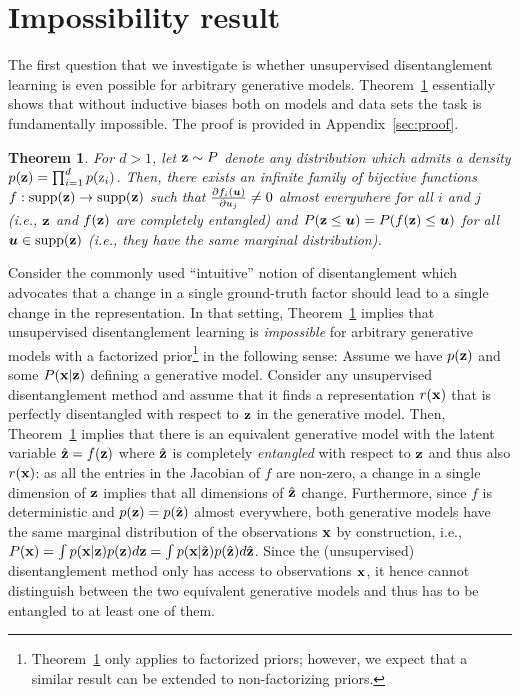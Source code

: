 \documentclass{article}
\newtheorem{theorem}{Theorem}
\renewcommand{\P}{P}
\newcommand{\supp}{\operatorname{supp}}
\begin{document}
\section{Impossibility result}\label{sec:impossibility}
The first question that we investigate is whether unsupervised disentanglement learning is even possible for arbitrary generative models.
Theorem~\ref{thm:impossibility} essentially shows that without inductive biases both on models and data sets the task is fundamentally impossible.
The proof is provided in Appendix~\ref{sec:proof}. 
\begin{theorem}
\label{thm:impossibility}
For $d>1$, let $\rvz\sim\P$ denote any distribution which admits a density $p({\mathbf{z}})=\prod_{i=1}^dp({\textnormal{z}}_i)$.
Then, there exists an infinite family of bijective functions $f:\supp(\rvz)\to\supp(\rvz)$ such that $\frac{\partial f_i({\bm{u}})}{\partial u_j} \neq 0$ almost everywhere for all $i$ and $j$ (i.e., ${\mathbf{z}}$ and $f({\mathbf{z}})$ are completely entangled) and $\P(\rvz \leq \vu) = \P(f(\rvz) \leq \vu)$ for all $\vu\in\supp(\rvz)$ (i.e., they have the same marginal distribution). 
\end{theorem}

Consider the commonly used ``intuitive'' notion of disentanglement which advocates that a change in a single ground-truth factor should lead to a single change in the representation.
In that setting, Theorem~\ref{thm:impossibility} implies that unsupervised disentanglement learning is \emph{impossible} for arbitrary generative models with a factorized prior\footnote{Theorem~\ref{thm:impossibility} only applies to factorized priors; however, we expect that a similar result can be extended to non-factorizing priors.} in the following sense:
Assume we have $p({\mathbf{z}})$ and some $P({\mathbf{x}}|{\mathbf{z}})$ defining a generative model. Consider any unsupervised disentanglement method and assume that it finds a representation $r({\mathbf{x}})$ that is perfectly disentangled with respect to ${\mathbf{z}}$ in the generative model.
Then, Theorem~\ref{thm:impossibility} implies that there is an equivalent generative model with the latent variable $\hat{{\mathbf{z}}}=f({\mathbf{z}})$ where $\hat{{\mathbf{z}}}$ is completely \emph{entangled} with respect to ${\mathbf{z}}$ and thus also $r({\mathbf{x}})$: as all the entries in the Jacobian of $f$ are non-zero, a change in a single dimension of ${\mathbf{z}}$ implies that all dimensions of $\hat{{\mathbf{z}}}$ change.
Furthermore, since $f$ is deterministic and $p({\mathbf{z}})=p(\hat{{\mathbf{z}}})$ almost everywhere, both generative models have the same marginal distribution of the observations ${\mathbf{x}}$ by construction, i.e., $P({\mathbf{x}}) = \int p({\mathbf{x}}| {\mathbf{z}})p({\mathbf{z}}) d{\mathbf{z}} = \int p({\mathbf{x}}|\hat{{\mathbf{z}}})p(\hat{{\mathbf{z}}}) d\hat{{\mathbf{z}}}$.
Since the (unsupervised) disentanglement method only has access to observations ${\mathbf{x}}$, it hence cannot distinguish between the two equivalent generative models and thus has to be entangled to at least one of them.
\end{document}
